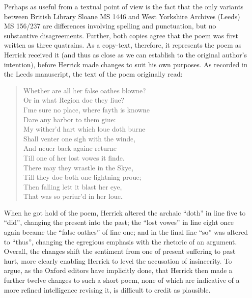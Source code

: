 \begin{paper}
Perhaps as useful from a textual point of view is the fact that the only
variants between British Library Sloane MS 1446 and West Yorkshire
Archives (Leeds) MS 156/237 are differences involving spelling and
punctuation, but no substantive disagreements. Further, both copies
agree that the poem was first written as three quatrains. As a
copy-text, therefore, it represents the poem as Herrick received it (and
thus as close as we can establish to the original author's intention),
before Herrick made changes to suit his own purposes. As recorded in the
Leeds manuscript, the text of the poem originally read:

\begin{quote}
Whether are all her false oathes blowne? \\
Or in what Region doe they liue? \\
I'me sure no place, where fayth is knowne \\
Dare any harbor to them giue: \\

My wither'd hart which loue doth burne \\
Shall venter one sigh with the winde, \\
And neuer back againe returne \\
Till one of her lost vowes it finde. \\

There may they wrastle in the Skye, \\
Till they doe both one lightning proue; \\
Then falling lett it blast her eye, \\
That was so periur'd in her loue.
\end{quote}

\noindent When he got hold of the poem, Herrick altered the archaic ``doth'' in line
five to ``did'', changing the present into the past; the ``lost vowes'' in
line eight once again became the ``false oathes'' of line one; and in the
final line ``so'' was altered to ``thus'', changing the egregious emphasis
with the rhetoric of an argument. Overall, the changes shift the
sentiment from one of present suffering to past hurt, more clearly
enabling Herrick to level the accusation of insincerity. To argue, as
the Oxford editors have implicitly done, that Herrick then made a
further twelve changes to such a short poem, none of which are
indicative of a more refined intelligence revising it, is difficult to
credit as plausible.


\end{paper}
